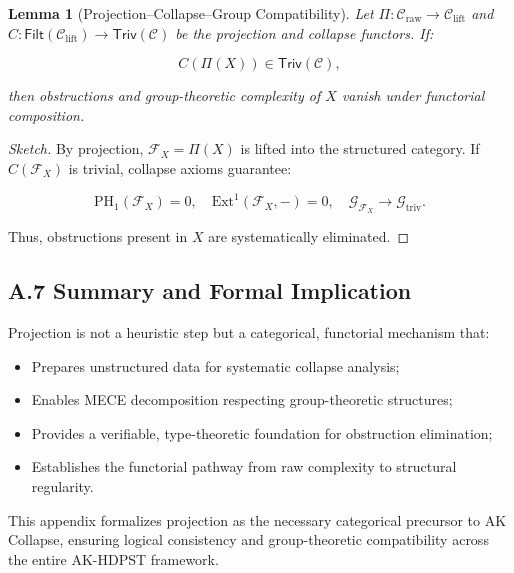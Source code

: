 \documentclass[11pt]{article}
\newtheorem{lemma}[theorem]{Lemma}
\begin{document}
\begin{lemma}[Projection–Collapse–Group Compatibility]
Let \( \Pi: \mathcal{C}_{\mathrm{raw}} \to \mathcal{C}_{\mathrm{lift}} \) and \( C: \mathsf{Filt}(\mathcal{C}_{\mathrm{lift}}) \to \mathsf{Triv}(\mathcal{C}) \) be the projection and collapse functors. If:

\[
C(\Pi(X)) \in \mathsf{Triv}(\mathcal{C}),
\]

then obstructions and group-theoretic complexity of \( X \) vanish under functorial composition.

\end{lemma}

\begin{proof}[Sketch]
By projection, \( \mathcal{F}_X = \Pi(X) \) is lifted into the structured category. If \( C(\mathcal{F}_X) \) is trivial, collapse axioms guarantee:

\[
\mathrm{PH}_1(\mathcal{F}_X) = 0, \quad \mathrm{Ext}^1(\mathcal{F}_X, -) = 0, \quad \mathcal{G}_{\mathcal{F}_X} \longrightarrow \mathcal{G}_{\mathrm{triv}}.
\]

Thus, obstructions present in \( X \) are systematically eliminated.
\end{proof}

\subsection*{A.7 Summary and Formal Implication}

Projection is not a heuristic step but a categorical, functorial mechanism that:

\begin{itemize}
    \item Prepares unstructured data for systematic collapse analysis;
    \item Enables MECE decomposition respecting group-theoretic structures;
    \item Provides a verifiable, type-theoretic foundation for obstruction elimination;
    \item Establishes the functorial pathway from raw complexity to structural regularity.
\end{itemize}

This appendix formalizes projection as the necessary categorical precursor to AK Collapse, ensuring logical consistency and group-theoretic compatibility across the entire AK-HDPST framework.



\end{document}
